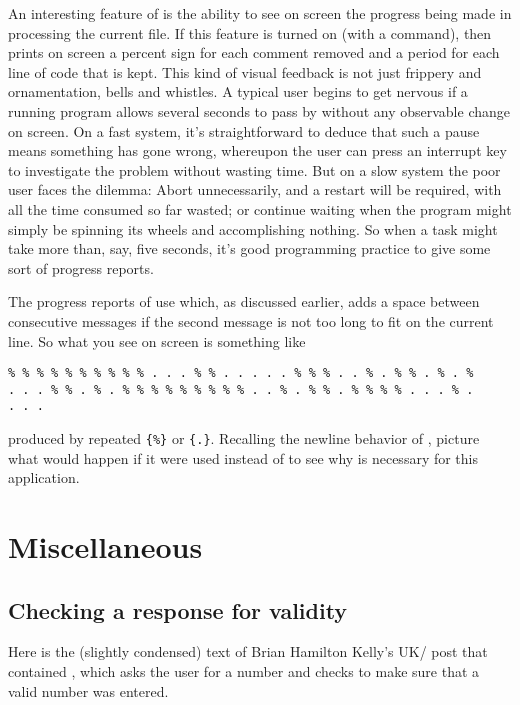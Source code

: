 {An interesting feature of  is the ability to see on
screen the progress being made in processing the current file. If
this feature is turned on (with a  command), then
 prints on screen a percent sign for each comment
removed and a period for each line of code that is kept. This kind of
visual feedback is not just frippery and ornamentation, bells and
whistles. A typical user begins to get nervous if a running program
allows several seconds to pass by without any observable change on
screen. On a fast system, it's straightforward to deduce that such a
pause means something has gone wrong, whereupon the user can press an
interrupt key to investigate the problem without wasting time. But on
a slow system the poor user faces the dilemma: Abort unnecessarily,
and a restart will be required, with all the time consumed so far
wasted; or continue waiting when the program might simply be spinning
its wheels and accomplishing nothing. So when a task might take
more than, say, five seconds, it's good programming practice to give
some sort of progress reports.

The progress reports of  use  which,
as discussed earlier, adds a space between consecutive messages if
the second message is not too long to fit on the current line. So
what you see on screen is something like
\begin{verbatim}
% % % % % % % % % % . . . % % . . . . . % % % . . % . % % . % . %
. . . % % . % . % % % % % % % % % . . % . % % . % % % % . . . % .
. . .
\end{verbatim}
produced by repeated \verb"{%}" or \verb"{.}".
Recalling the newline behavior of , picture
what would happen if it were used instead of  to see
why  is necessary for this application.

\section{Miscellaneous}

\subsection{Checking a response for validity}
Here is the (slightly condensed) text of Brian Hamilton Kelly's UK\tex/
post that contained  \cite{checknum}, which asks the
user for a number and checks to make sure that a valid number was
entered.

}
